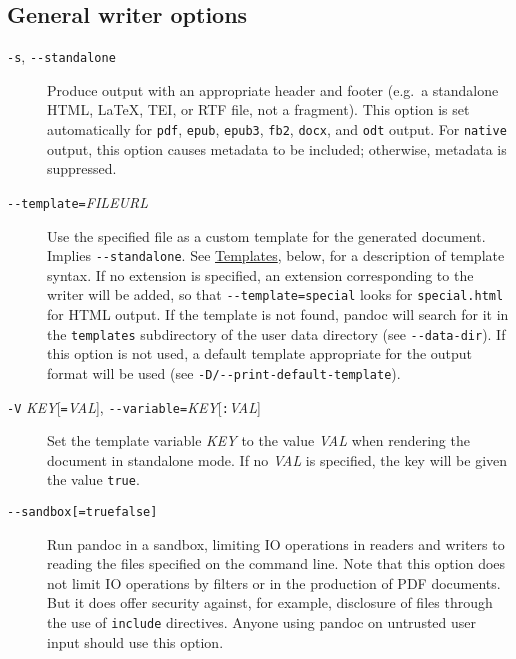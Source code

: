 \documentclass[
  a4paper,
]{article}
\begin{document}
\hypertarget{general-writer-options}{%
\subsection{General writer options}\label{general-writer-options}}

\begin{description}
\item[\texttt{-s}, \texttt{-\/-standalone}]
Produce output with an appropriate header and footer (e.g.~a standalone
HTML, LaTeX, TEI, or RTF file, not a fragment). This option is set
automatically for \texttt{pdf}, \texttt{epub}, \texttt{epub3},
\texttt{fb2}, \texttt{docx}, and \texttt{odt} output. For
\texttt{native} output, this option causes metadata to be included;
otherwise, metadata is suppressed.
\item[\texttt{-\/-template=}\emph{FILE}\textbar{}\emph{URL}]
Use the specified file as a custom template for the generated document.
Implies \texttt{-\/-standalone}. See
\protect\hyperlink{templates}{Templates}, below, for a description of
template syntax. If no extension is specified, an extension
corresponding to the writer will be added, so that
\texttt{-\/-template=special} looks for \texttt{special.html} for HTML
output. If the template is not found, pandoc will search for it in the
\texttt{templates} subdirectory of the user data directory (see
\texttt{-\/-data-dir}). If this option is not used, a default template
appropriate for the output format will be used (see
\texttt{-D/-\/-print-default-template}).
\item[\texttt{-V} \emph{KEY}{[}\texttt{=}\emph{VAL}{]},
\texttt{-\/-variable=}\emph{KEY}{[}\texttt{:}\emph{VAL}{]}]
Set the template variable \emph{KEY} to the value \emph{VAL} when
rendering the document in standalone mode. If no \emph{VAL} is
specified, the key will be given the value \texttt{true}.
\item[\texttt{-\/-sandbox{[}=true\textbar{}false{]}}]
Run pandoc in a sandbox, limiting IO operations in readers and writers
to reading the files specified on the command line. Note that this
option does not limit IO operations by filters or in the production of
PDF documents. But it does offer security against, for example,
disclosure of files through the use of \texttt{include} directives.
Anyone using pandoc on untrusted user input should use this option.


\end{description}
\end{document}

